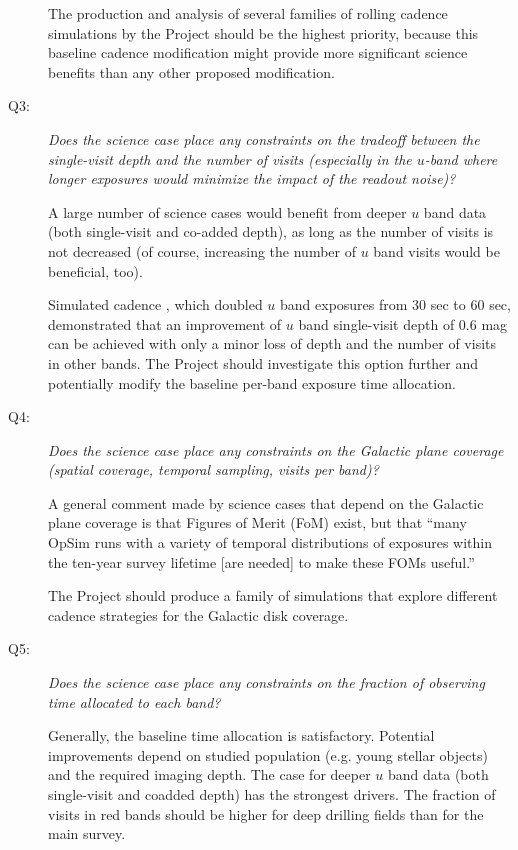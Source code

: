 \begin{description}
The production and analysis of several families of rolling cadence
simulations by the Project should be the highest priority, because this
baseline cadence modification might provide more significant science
benefits than any other proposed modification.


\item[Q3:] {\it Does the science case place any constraints on the
tradeoff between the single-visit depth and the number of visits
(especially in the $u$-band where longer exposures would minimize the
impact of the readout noise)?}


A large number of science cases would benefit from deeper $u$ band data
(both single-visit and co-added depth), as long as the number of visits
is not decreased (of course, increasing the number of $u$ band visits
would be beneficial, too).

Simulated cadence , which
doubled $u$ band exposures from 30 sec to 60 sec, demonstrated that an
improvement of $u$ band single-visit depth of 0.6 mag can be achieved
with only a minor loss of depth and the number of visits in other bands.
The Project should investigate this option further and potentially
modify the baseline per-band exposure time allocation.


\item[Q4:] {\it Does the science case place any constraints on the
Galactic plane coverage (spatial coverage, temporal sampling, visits per
band)?}

A general comment made by science cases that depend on the Galactic
plane coverage is that Figures of Merit (FoM) exist, but that ``many
OpSim runs with a variety of temporal distributions of exposures within
the ten-year survey lifetime [are needed] to make these FOMs useful.''

The Project should produce a family of simulations that explore
different cadence strategies for the Galactic disk coverage.


\item[Q5:] {\it Does the science case place any constraints on the
fraction of observing time allocated to each band?}

Generally, the baseline time allocation is satisfactory. Potential
improvements depend on studied population (e.g. young stellar objects)
and the required imaging depth.
The case for deeper $u$ band data (both single-visit and coadded depth)
has the strongest drivers. The fraction of visits in red bands should be
higher for deep drilling fields than for the main survey.


\end{description}
